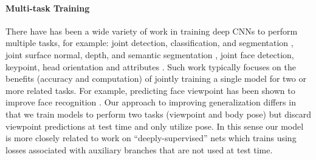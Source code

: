 \documentclass[runningheads]{llncs}
\begin{document}
\paragraph{Multi-task Training}
There have has been a wide variety of work in training deep CNNs to perform multiple tasks, for example: joint detection, classification, and segmentation \cite{maskrcnn}, joint surface normal, depth, and semantic segmentation \cite{ubernet}, joint face detection, keypoint, head orientation and attributes \cite{hyperface}. 
Such work typically focuses on the benefits (accuracy and computation)
of jointly training a single model for two or more related tasks.
For example, predicting face viewpoint has been shown to improve face recognition \cite{yin2017multi}. Our approach
to improving generalization differs in that we train models to perform
two tasks (viewpoint and body pose) but discard viewpoint predictions at test 
time and only utilize pose. In this sense our model is more closely 
related to work on ``deeply-supervised'' nets \cite{lee2015deeply,HEG} which 
trains using losses associated with auxiliary branches that are not  
used at test time.
\end{document}
